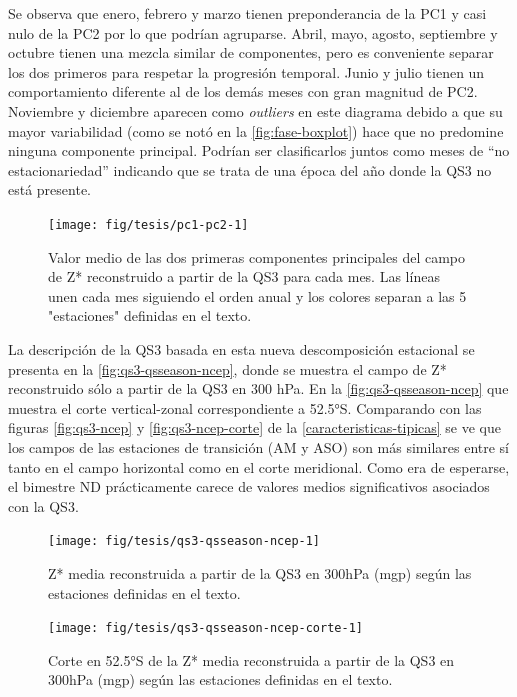 \documentclass[spanish,a4paper,12pt,oneside]{book}
\begin{document}
Se observa que enero, febrero y marzo tienen preponderancia de la PC1 y
casi nulo de la PC2 por lo que podrían agruparse. Abril, mayo, agosto,
septiembre y octubre tienen una mezcla similar de componentes, pero es
conveniente separar los dos primeros para respetar la progresión
temporal. Junio y julio tienen un comportamiento diferente al de los
demás meses con gran magnitud de PC2. Noviembre y diciembre aparecen
como \emph{outliers} en este diagrama debido a que su mayor variabilidad
(como se notó en la \autoref{fig:fase-boxplot}) hace que no predomine
ninguna componente principal. Podrían ser clasificarlos juntos como
meses de ``no estacionariedad'' indicando que se trata de una época del
año donde la QS3 no está presente.

\begin{figure}
\texttt{[image: fig/tesis/pc1-pc2-1]} \caption{Valor medio de las dos primeras componentes principales del campo de Z* reconstruido a partir de la QS3 para cada mes. Las líneas unen cada mes siguiendo el orden anual y los colores separan a las 5 "estaciones" definidas en el texto.}\label{fig:pc1-pc2}
\end{figure}

La descripción de la QS3 basada en esta nueva descomposición estacional
se presenta en la \autoref{fig:qs3-qsseason-ncep}, donde se muestra el
campo de Z* reconstruido sólo a partir de la QS3 en 300 hPa. En la
\autoref{fig:qs3-qsseason-ncep} que muestra el corte vertical-zonal
correspondiente a 52.5°S. Comparando con las figuras \ref{fig:qs3-ncep}
y \ref{fig:qs3-ncep-corte} de la \autoref{caracteristicas-tipicas} se ve
que los campos de las estaciones de transición (AM y ASO) son más
similares entre sí tanto en el campo horizontal como en el corte
meridional. Como era de esperarse, el bimestre ND prácticamente carece
de valores medios significativos asociados con la QS3.

\begin{figure}
\texttt{[image: fig/tesis/qs3-qsseason-ncep-1]} \caption{Z* media reconstruida a partir de la QS3 en 300hPa (mgp) según las estaciones definidas en el texto.}\label{fig:qs3-qsseason-ncep}
\end{figure}

\begin{figure}
\texttt{[image: fig/tesis/qs3-qsseason-ncep-corte-1]} \caption{Corte en 52.5°S de la Z* media reconstruida a partir de la QS3 en 300hPa (mgp) según las estaciones definidas en el texto.}\label{fig:qs3-qsseason-ncep-corte}
\end{figure}
\end{document}
